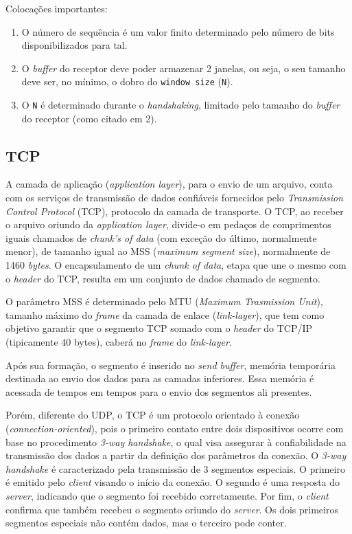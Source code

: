 Colocações importantes:

\begin{enumerate}
\def\labelenumi{\arabic{enumi}.}
\tightlist
\item
  O número de sequência é um valor finito determinado pelo número de
  bits disponibilizados para tal.
\item
  O \emph{buffer} do receptor deve poder armazenar 2 janelas, ou seja, o
  seu tamanho deve ser, no mínimo, o dobro do \texttt{window\ size}
  (\texttt{N}).
\item
  O \texttt{N} é determinado durante o \emph{handshaking}, limitado pelo
  tamanho do \emph{buffer} do receptor (como citado em 2).
\end{enumerate}

\hypertarget{tcp}{%
\subsection{TCP}\label{tcp}}

A camada de aplicação (\emph{application layer}), para o envio de um
arquivo, conta com os serviços de transmissão de dados confiáveis
fornecidos pelo \emph{Transmission Control Protocol} (TCP), protocolo da
camada de transporte. O TCP, ao receber o arquivo oriundo da
\emph{application layer}, divide-o em pedaços de comprimentos iguais
chamados de \emph{chunk's of data} (com exceção do último, normalmente
menor), de tamanho igual ao MSS (\emph{maximum segment size}),
normalmente de 1460 \emph{bytes}. O encapsulamento de um \emph{chunk of
data}, etapa que une o mesmo com o \emph{header} do TCP, resulta em um
conjunto de dados chamado de segmento.

O parâmetro MSS é determinado pelo MTU (\emph{Maximum Trasmission
Unit}), tamanho máximo do \emph{frame} da camada de enlace
(\emph{link-layer}), que tem como objetivo garantir que o segmento TCP
somado com o \emph{header} do TCP/IP (tipicamente 40 bytes), caberá no
\emph{frame} do \emph{link-layer}.

Após sua formação, o segmento é inserido no \emph{send buffer}, memória
temporária destinada ao envio dos dados para as camadas inferiores. Essa
memória é acessada de tempos em tempos para o envio dos segmentos ali
presentes.

Porém, diferente do UDP, o TCP é um protocolo orientado à conexão
(\emph{connection-oriented}), pois o primeiro contato entre dois
dispositivos ocorre com base no procedimento \emph{3-way handshake}, o
qual visa assegurar à confiabilidade na transmissão dos dados a partir
da definição dos parâmetros da conexão. O \emph{3-way handshake} é
caracterizado pela transmissão de 3 segmentos especiais. O primeiro é
emitido pelo \emph{client} visando o início da conexão. O segundo é uma
resposta do \emph{server}, indicando que o segmento foi recebido
corretamente. Por fim, o \emph{client} confirma que também recebeu o
segmento oriundo do \emph{server}. Os dois primeiros segmentos especiais
não contém dados, mas o terceiro pode conter.

